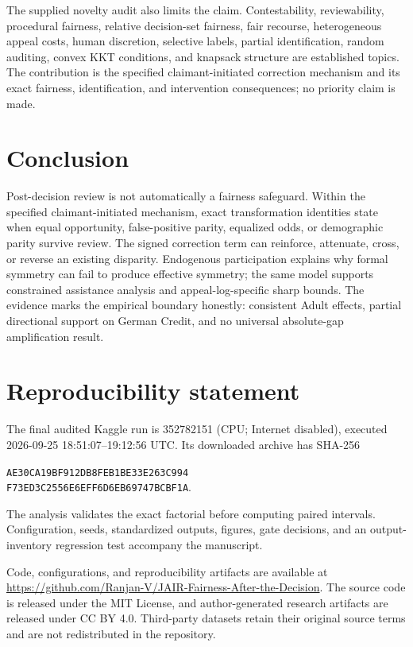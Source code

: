 \documentclass[manuscript,screen,review]{jair}
\begin{document}
The supplied novelty audit also limits the claim.  Contestability,
reviewability, procedural fairness, relative decision-set fairness, fair
recourse, heterogeneous appeal costs, human discretion, selective labels,
partial identification, random auditing, convex KKT conditions, and knapsack
structure are established topics.  The contribution is the specified
claimant-initiated correction mechanism and its exact fairness, identification,
and intervention consequences; no priority claim is made.

\section{Conclusion}

Post-decision review is not automatically a fairness safeguard.  Within the
specified claimant-initiated mechanism, exact transformation identities state
when equal opportunity, false-positive parity, equalized odds, or demographic
parity survive review.  The signed correction term can reinforce, attenuate,
cross, or reverse an existing disparity.  Endogenous participation explains
why formal symmetry can fail to produce effective symmetry; the same model
supports constrained assistance analysis and appeal-log-specific sharp bounds.
The evidence marks the empirical boundary honestly: consistent Adult effects,
partial directional support on German Credit, and no universal absolute-gap
amplification result.

\section*{Reproducibility statement}

The final audited Kaggle run is 352782151 (CPU; Internet disabled), executed
2026-09-25 18:51:07--19:12:56 UTC.  Its downloaded archive has SHA-256
\begin{center}
\small\texttt{AE30CA19BF912DB8FEB1BE33E263C994}\\[-2pt]
\texttt{F73ED3C2556E6EFF6D6EB69747BCBF1A}.
\end{center}
The analysis validates the exact factorial before computing paired intervals.
Configuration, seeds, standardized outputs, figures, gate decisions, and an
output-inventory regression test accompany the manuscript.

Code, configurations, and reproducibility artifacts are available at
\url{https://github.com/Ranjan-V/JAIR-Fairness-After-the-Decision}.
The source code is released under the MIT License, and author-generated
research artifacts are released under CC BY 4.0. Third-party datasets retain
their original source terms and are not redistributed in the repository.
\end{document}
